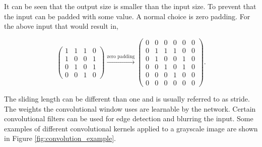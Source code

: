 \begin{description}
        It can be seen that the output size is smaller than the input size. To
        prevent that the input can be padded with some value. A normal choice is
        zero padding. For the above input that would result in,

        \begin{equation}
            \begin{pmatrix}
                1 & 1 & 1 & 0 \\
                1 & 0 & 0 & 1 \\
                0 & 1 & 0 & 1 \\
                0 & 0 & 1 & 0
            \end{pmatrix} \xrightarrow{\text{zero padding}}
            \begin{pmatrix}
                0 & 0 & 0 & 0 & 0 & 0 \\
                0 & 1 & 1 & 1 & 0 & 0 \\
                0 & 1 & 0 & 0 & 1 & 0 \\
                0 & 0 & 1 & 0 & 1 & 0 \\
                0 & 0 & 0 & 1 & 0 & 0 \\
                0 & 0 & 0 & 0 & 0 & 0
            \end{pmatrix}.
        \end{equation}

        The sliding length can be different than one and is usually referred
        to as stride. The weights the convolutional window uses are learnable
        by the network. Certain convolutional filters can be used for
        edge detection and blurring the input. Some examples of different
        convolutional kernels applied to a grayscale image are shown in Figure
        \ref{fig:convolution_example}.


\end{description}
